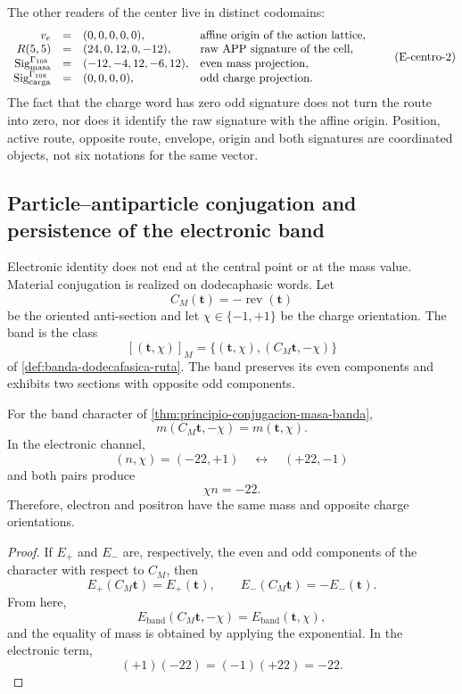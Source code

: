 The other readers of the center live in distinct codomains:
\[
\begin{array}{rcll}
 v_e&=&(0,0,0,0,0),
   &\text{affine origin of the action lattice},\\
 R(5,5)&=&(24,0,12,0,-12),
   &\text{raw APP signature of the cell},\\
 \operatorname{Sig}^{\Gamma_{108}}_{\rm masa}
   &=&(-12,-4,12,-6,12),
   &\text{even mass projection},\\
 \operatorname{Sig}^{\Gamma_{108}}_{\rm carga}
   &=&(0,0,0,0),
   &\text{odd charge projection}.
\end{array}
\tag{E-centro-2}\label{eq:electron-firmas-tipadas-rev8}
\]
The fact that the charge word has zero odd signature does not turn the route into
zero, nor does it identify the raw signature with the affine origin. Position, active
route, opposite route, envelope, origin and both signatures are coordinated
objects, not six notations for the same vector.

\subsection{Particle–antiparticle conjugation and persistence of the electronic band}

Electronic identity does not end at the central point or at the mass
value. Material conjugation is realized on dodecaphasic words. Let
\[
 C_M(\mathbf t)=-\operatorname{rev}(\mathbf t)
\]
be the oriented anti-section and let
\(\chi\in\{-1,+1\}\) be the charge orientation. The band is the class
\[
 [(\mathbf t,\chi)]_M
 =
 \{(\mathbf t,\chi),(C_M\mathbf t,-\chi)\}
\]
of \cref{def:banda-dodecafasica-ruta}. The band preserves its even
components and exhibits two sections with opposite odd components.

\begin{theorem}
\label{thm:electron-positron-biografia-rev6}
For the band character of
\cref{thm:principio-conjugacion-masa-banda},
\[
 m(C_M\mathbf t,-\chi)=m(\mathbf t,\chi).
\]
In the electronic channel,
\[
 (n,\chi)=(-22,+1)
 \quad\longleftrightarrow\quad
 (+22,-1)
\]
and both pairs produce
\[
 \chi n=-22.
\]
Therefore, electron and positron have the same mass and opposite charge orientations.
\end{theorem}

\begin{proof}
If \(E_+\) and \(E_-\) are, respectively, the even and odd
components of the character with respect to \(C_M\), then
\[
 E_+(C_M\mathbf t)=E_+(\mathbf t),
 \qquad
 E_-(C_M\mathbf t)=-E_-(\mathbf t).
\]
From here,
\[
 E_{\mathrm{band}}(C_M\mathbf t,-\chi)
 =
 E_{\mathrm{band}}(\mathbf t,\chi),
\]
and the equality of mass is obtained by applying the exponential. In the electronic term,
\[
 (+1)(-22)=(-1)(+22)=-22.
\]
\end{proof}

